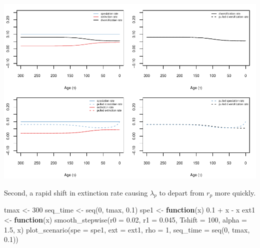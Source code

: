 \documentclass[
]{article}
\newenvironment{Shaded}{\begin{snugshade}}{\end{snugshade}}
\newcommand{\AttributeTok}[1]{\textcolor[rgb]{0.77,0.63,0.00}{#1}}
\newcommand{\ControlFlowTok}[1]{\textcolor[rgb]{0.13,0.29,0.53}{\textbf{#1}}}
\newcommand{\DecValTok}[1]{\textcolor[rgb]{0.00,0.00,0.81}{#1}}
\newcommand{\FloatTok}[1]{\textcolor[rgb]{0.00,0.00,0.81}{#1}}
\newcommand{\FunctionTok}[1]{\textcolor[rgb]{0.00,0.00,0.00}{#1}}
\newcommand{\NormalTok}[1]{#1}
\newcommand{\OtherTok}[1]{\textcolor[rgb]{0.56,0.35,0.01}{#1}}
\newcommand{\SpecialCharTok}[1]{\textcolor[rgb]{0.00,0.00,0.00}{#1}}
\begin{document}
\includegraphics{supplement_files/figure-latex/unnamed-chunk-8-1.pdf}

\pagebreak

Second, a rapid shift in extinction rate causing \(\lambda_p\) to depart
from \(r_p\) more quickly.

\begin{Shaded}
\begin{Highlighting}[]
\NormalTok{tmax }\OtherTok{\textless{}{-}} \DecValTok{300}
\NormalTok{seq\_time }\OtherTok{\textless{}{-}} \FunctionTok{seq}\NormalTok{(}\DecValTok{0}\NormalTok{, tmax, }\FloatTok{0.1}\NormalTok{)}
\NormalTok{spe1 }\OtherTok{\textless{}{-}} \ControlFlowTok{function}\NormalTok{(x) }\FloatTok{0.1} \SpecialCharTok{+}\NormalTok{ x }\SpecialCharTok{{-}}\NormalTok{ x}
\NormalTok{ext1 }\OtherTok{\textless{}{-}} \ControlFlowTok{function}\NormalTok{(x) }\FunctionTok{smooth\_stepwise}\NormalTok{(}\AttributeTok{r0 =} \FloatTok{0.02}\NormalTok{, }\AttributeTok{r1 =} \FloatTok{0.045}\NormalTok{, }\AttributeTok{Tshift =} \DecValTok{100}\NormalTok{,}
    \AttributeTok{alpha =} \FloatTok{1.5}\NormalTok{, x)}
\FunctionTok{plot\_scenario}\NormalTok{(}\AttributeTok{spe =}\NormalTok{ spe1, }\AttributeTok{ext =}\NormalTok{ ext1, }\AttributeTok{rho =} \DecValTok{1}\NormalTok{, }\AttributeTok{seq\_time =} \FunctionTok{seq}\NormalTok{(}\DecValTok{0}\NormalTok{,}
\NormalTok{    tmax, }\FloatTok{0.1}\NormalTok{))}
\end{Highlighting}
\end{Shaded}
\end{document}
